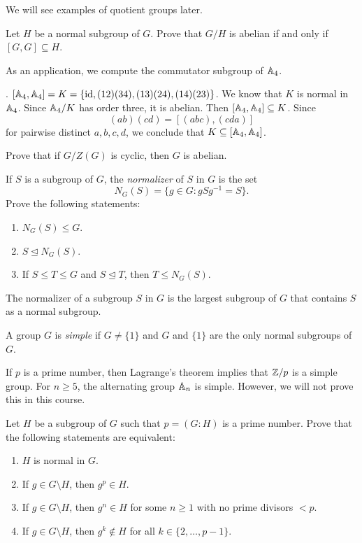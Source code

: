We will see examples of quotient groups later. 

\begin{exercise}
\label{xca:commutator}
Let $H$ be a normal subgroup of $G$. Prove that
$G/H$ is abelian if and only if $[G,G]\subseteq H$.
\end{exercise}

As an application, 
we compute the commutator subgroup of $\mathbb{A}_4$. 

\begin{example}
.
$[\mathbb{A}_4,\mathbb{A}_4]=K=\{\operatorname{id},(12)(34),(13)(24),(14)(23)\}$.
We know that $K$ is normal in $\mathbb{A}_4$. Since $\mathbb{A}_4/K$ has order three, 
it is abelian. Then $[\mathbb{A}_4,\mathbb{A}_4]\subseteq K$. Since 
\[
(ab)(cd)=[(abc),(cda)]
\]
for pairwise distinct $a,b,c,d$, 
we conclude that $K\subseteq[\mathbb{A}_4,\mathbb{A}_4]$.
\end{example}

\begin{exercise}
\label{xca:G/Z(G)}
Prove that if $G/Z(G)$ is cyclic, then $G$ is abelian.
\end{exercise}

\begin{exercise}
\label{xca:normalizer}
If $S$ is a subgroup of $G$, the \emph{normalizer} of $S$ in $G$
is the set  
\[
N_G(S)=\{g\in G:gSg^{-1}=S\}.
\]
Prove the following statements:
\begin{enumerate}
\item $N_G(S)\leq G$. 
\item $S\unlhd N_G(S)$.
\item If $S\leq T\leq G$ and $S\unlhd T$, then $T\leq N_G(S)$.
\end{enumerate}
\end{exercise}

The normalizer of a subgroup  $S$ in $G$ is the largest 
subgroup of $G$ that contains $S$ as a normal subgroup. 

\begin{definition}
A group $G$ is \emph{simple} if $G\ne\{1\}$ and 
$G$ and $\{1\}$ are the only normal subgroups of $G$. 
\end{definition}

If $p$ is a prime number, then Lagrange's theorem implies that 
$\mathbb{Z}/p$ is a simple group. 
For $n\geq5$, the alternating group $\mathbb{A}_n$ is simple. However, 
we will not
prove this in this course. 

\begin{bonus}
\label{xca:index_p}
Let $H$ be a subgroup of $G$ such that $p=(G:H)$ is a prime number. 
Prove that the following statements are equivalent:
\begin{enumerate}
\item $H$ is normal in $G$.
\item If $g\in G\setminus H$, then $g^p\in H$. 
\item If $g\in G\setminus H$, then $g^n\in H$ for some $n\geq1$ with no prime divisors $<p$.
\item If $g\in G\setminus H$, then $g^k\not\in H$ for all $k\in\{2,\dots,p-1\}$.
\end{enumerate}
\end{bonus}

